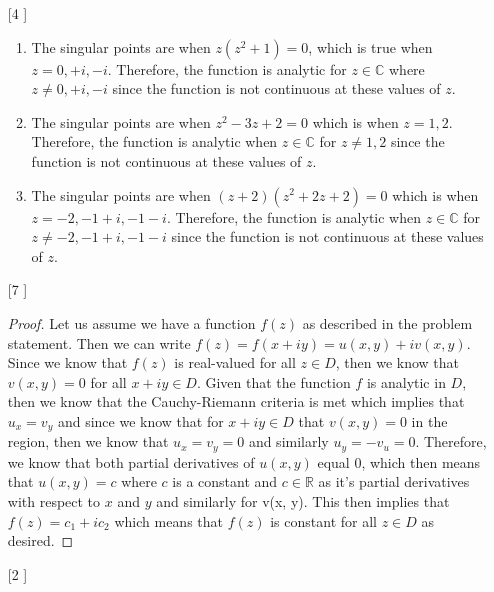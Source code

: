 \documentclass{article}
\theoremstyle{definition}
\newcommand{\C}{\mathbb{C}}
\newcommand{\R}{\mathbb{R}}
\begin{document}
\begin{enumerate}
    \item [[\phantom{-}4]]
    
    \begin{enumerate}
        \item 
        
        The singular points are when $z(z^2 + 1) = 0$, which is true when $z = 0, +i, -i$. Therefore, the function is analytic for $z\in \C$ where $z \neq 0, +i, -i$ since the function is not continuous at these values of $z$.
        
        \item
        
        The singular points are when $z^2 - 3z + 2 = 0$ which is when $z = 1, 2$. Therefore, the function is analytic when $z\in \C$ for $z\neq 1, 2$ since the function is not continuous at these values of $z$.
        
        \item
        
        The singular points are when $(z+2)(z^2 + 2z + 2) = 0$ which is when $z = -2, -1 + i, -1 - i$. Therefore, the function is analytic when $z\in \C$ for $z\neq -2, -1 + i, -1 - i$ since the function is not continuous at these values of $z$.
        
    \end{enumerate}
    
    \item [[\phantom{-}7]]
    
    \begin{proof}
    Let us assume we have a function $f(z)$ as described in the problem statement. Then we can write $f(z) = f(x + iy) = u(x,y) + iv(x,y)$. Since we know that $f(z)$ is real-valued for all $z\in D$, then we know that $v(x,y) = 0$ for all $x + iy\in D$. Given that the function $f$ is analytic in $D$, then we know that the Cauchy-Riemann criteria is met which implies that $u_x = v_y$ and since we know that for $x + iy \in D$ that $v(x, y) = 0$ in the region, then we know that $u_x = v_y = 0$ and similarly $u_y = -v_u = 0$. Therefore, we know that both partial derivatives of $u(x,y)$ equal $0$, which then means that $u(x, y) = c$ where $c$ is a constant and $c\in \R$ as it's partial derivatives with respect to $x$ and $y$ and similarly for v(x, y). This then implies that $f(z) = c_1 + ic_2$ which means that $f(z)$ is constant for all $z\in D$ as desired.
    \end{proof}
    
    \item [[\phantom{-}2]]
    

\end{enumerate}
\end{document}
